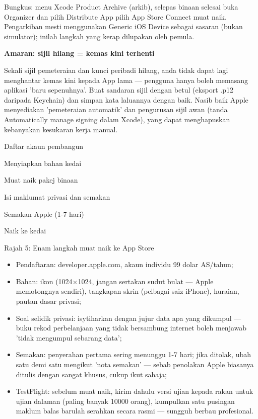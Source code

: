 Bungkus: menu Xcode Product Archive (arkib), selepas binaan selesai buka Organizer dan pilih Distribute App pilih App Store Connect muat naik. Pengarkiban mesti menggunakan Generic iOS Device sebagai sasaran (bukan simulator); inilah langkah yang kerap dilupakan oleh pemula.

\textbf{Amaran: sijil hilang = kemas kini terhenti}\par

Sekali sijil pemeteraian dan kunci peribadi hilang, anda tidak dapat lagi menghantar kemas kini kepada App lama — pengguna hanya boleh memasang aplikasi 'baru sepenuhnya'. Buat sandaran sijil dengan betul (eksport .p12 daripada Keychain) dan simpan kata laluannya dengan baik. Nasib baik Apple menyediakan 'pemeteraian automatik' dan pengurusan sijil awan (tanda Automatically manage signing dalam Xcode), yang dapat menghapuskan kebanyakan kesukaran kerja manual.


Daftar akaun pembangun

Menyiapkan bahan kedai

Muat naik pakej binaan

Isi maklumat privasi dan semakan

Semakan Apple (1-7 hari)

Naik ke kedai

\begin{center}\small\color{gray}Rajah 5: Enam langkah muat naik ke App Store\end{center}

\begin{itemize}
  \item Pendaftaran: developer.apple.com, akaun individu 99 dolar AS/tahun;
  \item Bahan: ikon (1024×1024, jangan sertakan sudut bulat — Apple memotongnya sendiri), tangkapan skrin (pelbagai saiz iPhone), huraian, pautan dasar privasi;
  \item Soal selidik privasi: isytiharkan dengan jujur data apa yang dikumpul — buku rekod perbelanjaan yang tidak bersambung internet boleh menjawab 'tidak mengumpul sebarang data';
  \item Semakan: penyerahan pertama sering menunggu 1-7 hari; jika ditolak, ubah satu demi satu mengikut 'nota semakan' — sebab penolakan Apple biasanya ditulis dengan sangat khusus, cukup ikut sahaja;
  \item TestFlight: sebelum muat naik, kirim dahulu versi ujian kepada rakan untuk ujian dalaman (paling banyak 10000 orang), kumpulkan satu pusingan maklum balas barulah serahkan secara rasmi — sungguh berbau profesional.
\end{itemize}

